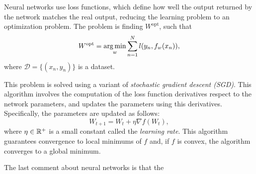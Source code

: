 Neural networks use loss functions, which define how well the output returned by the network matches the real output, reducing the learning problem to an optimization problem. The problem is finding $W^{\operatorname{opt}}$, such that
\[
W^{\operatorname{opt}}   = \operatorname*{arg\,min}_{w} \sum_{n = 1}^N l(y_n, f_w(x_n)),
\]
where $\mathcal D = \{(x_n,y_n)\}$ is a dataset.

This problem is solved using a variant of \emph{stochastic gradient descent (SGD)}. This algorithm involves the computation of the loss function derivatives respect to the network parameters, and updates the parameters using this derivatives. Specifically, the parameters are updated as follows:
\[
W_{t+1} = W_t + \eta \nabla f(W_t),
\]
where $\eta \in \mathbb{R}^+$ is a small constant called the \emph{learning rate}. This algorithm guarantees convergence to local minimums of $f$ and, if $f$ is convex, the algorithm converges to a global minimum.

The last comment about neural networks is that the